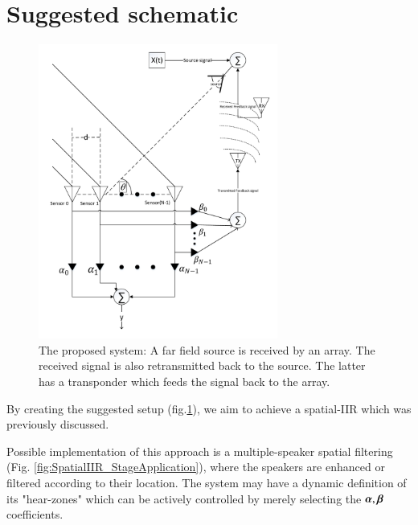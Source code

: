 \documentclass[a4paper,12pt,oneside]{report}
\begin{document}
\section*{Suggested schematic}
\begin{figure}[!ht]
\begin{center}
\includegraphics[width=0.7\textwidth]{./Media/SpatialIIR-diagram/SpatialIIR_VER4.pdf}
\caption
{
The proposed system: A far field source is received by an array. 
The received signal is also retransmitted back to the source. 
The latter has a transponder which feeds the signal back to the array.
}
\label{fig:SignalModel}
\end{center}
\end{figure}
By creating the suggested setup (fig.\ref{fig:SignalModel}), we aim to achieve a spatial-IIR which was previously discussed. 

Possible implementation of this approach is a multiple-speaker spatial filtering (Fig. \ref{fig:SpatialIIR_StageApplication}), where the speakers are enhanced or filtered according to their location. 
The system may have a dynamic definition of its "hear-zones" which can be actively controlled by merely selecting the $ \boldsymbol{\alpha},\boldsymbol{\beta} $ coefficients.
\end{document}
